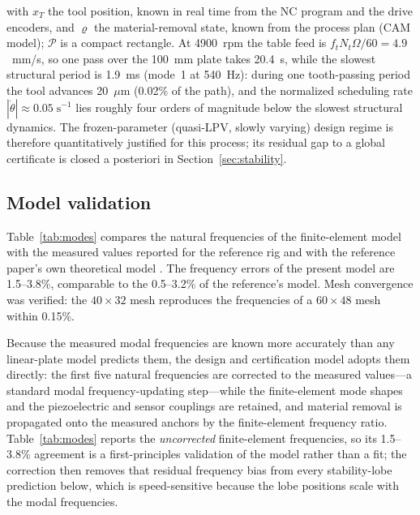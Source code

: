 \documentclass[preprint,12pt]{elsarticle}
\begin{document}
with $x_T$ the tool position, known in real time from the NC program and
the drive encoders, and $\varrho$ the material-removal state, known from
the process plan (CAM model); $\mathcal{P}$ is a compact rectangle. At
4900~rpm the table feed is
$f_t N_t \Omega / 60 = 4.9$~mm/s, so one pass over the 100~mm plate
takes 20.4~s, while the slowest structural period is 1.9~ms (mode~1 at
540~Hz): during one tooth-passing period the tool advances 20~$\mu$m
(0.02\% of the path), and the normalized scheduling rate
$|\dot{\theta}| \approx 0.05\;\mathrm{s}^{-1}$ lies roughly four orders
of magnitude below the slowest structural dynamics. The
frozen-parameter (quasi-LPV, slowly varying) design regime
\cite{shamma1991guaranteed,rugh2000research} is therefore quantitatively
justified for this process; its residual gap to a global certificate is
closed a posteriori in Section~\ref{sec:stability}.

\subsection{Model validation}
\label{sec:validation}

Table~\ref{tab:modes} compares the natural frequencies of the
finite-element model with the measured values reported for the reference
rig and with the reference paper's own theoretical model
\cite{du2024robust}. The frequency errors of the present model are
1.5--3.8\%, comparable to the 0.5--3.2\% of the reference's model.
Mesh convergence was verified: the $40 \times 32$ mesh reproduces the
frequencies of a $60 \times 48$ mesh within 0.15\%.

Because the measured modal frequencies are known more accurately than any
linear-plate model predicts them, the design and certification model
adopts them directly: the first five natural frequencies are corrected to
the measured values---a standard modal frequency-updating step---while the
finite-element mode shapes and the piezoelectric and sensor couplings are
retained, and material removal is propagated onto the measured anchors by
the finite-element frequency ratio. Table~\ref{tab:modes} reports the
\emph{uncorrected} finite-element frequencies, so its 1.5--3.8\% agreement
is a first-principles validation of the model rather than a fit; the
correction then removes that residual frequency bias from every
stability-lobe prediction below, which is speed-sensitive because the
lobe positions scale with the modal frequencies.
\end{document}

